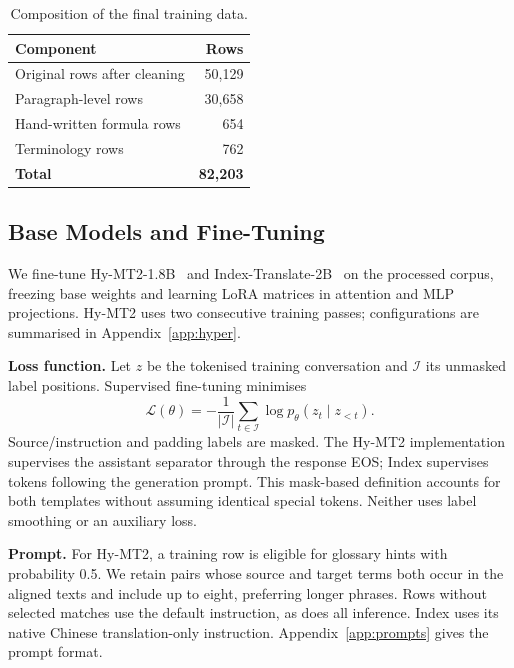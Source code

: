 \documentclass[11pt]{article}
\begin{document}
\begin{table}[t]
\centering
\small
\begin{tabular}{lr}
\toprule
Component & Rows \\
\midrule
Original rows after cleaning & 50,129 \\
Paragraph-level rows & 30,658 \\
Hand-written formula rows & 654 \\
Terminology rows & 762 \\
\midrule
\textbf{Total} & \textbf{82,203} \\
\bottomrule
\end{tabular}
\caption{Composition of the final training data.}
\label{tab:composition}
\end{table}

\subsection{Base Models and Fine-Tuning}\label{sec:finetune}
We fine-tune Hy-MT2-1.8B~\cite{zheng2026hymt2} and Index-Translate-2B~\cite{indexteam} on the processed corpus, freezing base weights and learning LoRA matrices in attention and MLP projections. Hy-MT2 uses two consecutive training passes; configurations are summarised in Appendix~\ref{app:hyper}.

\textbf{Loss function.} Let $z$ be the tokenised training conversation and $\mathcal{I}$ its unmasked label positions. Supervised fine-tuning minimises
\begin{equation}
\mathcal{L}(\theta)=-\frac{1}{|\mathcal{I}|}\sum_{t\in\mathcal{I}}\log p_\theta(z_t\mid z_{<t}).
\label{eq:loss}
\end{equation}
Source/instruction and padding labels are masked. The Hy-MT2 implementation supervises the assistant separator through the response EOS; Index supervises tokens following the generation prompt. This mask-based definition accounts for both templates without assuming identical special tokens. Neither uses label smoothing or an auxiliary loss.

\textbf{Prompt.} For Hy-MT2, a training row is eligible for glossary hints with probability 0.5. We retain pairs whose source and target terms both occur in the aligned texts and include up to eight, preferring longer phrases. Rows without selected matches use the default instruction, as does all inference. Index uses its native Chinese translation-only instruction. Appendix~\ref{app:prompts} gives the prompt format.
\end{document}
